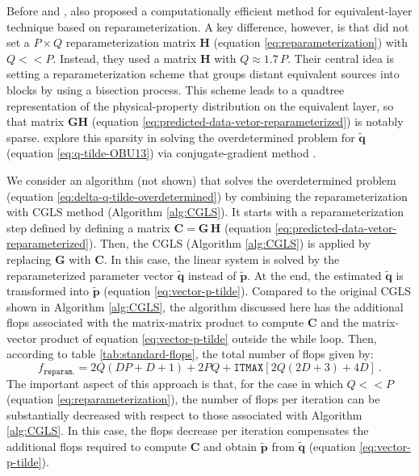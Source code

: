 Before \cite{oliveirajr-etal2013} and \cite{mendonca-2020}, \cite{barnes-lumley2011} also proposed a computationally
efficient method for equivalent-layer technique based on reparameterization. 
A key difference, however, is that \cite{barnes-lumley2011} did not set a $P \times Q$ reparameterization matrix $\mathbf{H}$
(equation \ref{eq:reparameterization}) with $Q << P$. 
Instead, they used a matrix $\mathbf{H}$ with $Q \approx 1.7 \, P$. 
Their central idea is setting a reparameterization scheme that groups distant equivalent sources into blocks by
using a bisection process. 
This scheme leads to a quadtree representation of the physical-property distribution on the equivalent layer, 
so that matrix $\mathbf{G}\mathbf{H}$ (equation \ref{eq:predicted-data-vetor-reparameterized}) is notably sparse.
\cite{barnes-lumley2011} explore this sparsity in solving the overdetermined problem for $\tilde{\mathbf{q}}$
(equation \ref{eq:q-tilde-OBU13}) via conjugate-gradient method \cite[e.g.,][sec. 11.3]{golub-vanloan2013}.

We consider an algorithm (not shown) that solves the overdetermined problem (equation \ref{eq:delta-q-tilde-overdetermined}) by
combining the reparameterization with CGLS method (Algorithm \ref{alg:CGLS}).
It starts with a reparameterization step defined by defining a matrix $\mathbf{C} = \mathbf{G \, H}$ 
(equation \ref{eq:predicted-data-vetor-reparameterized}).
Then, the CGLS (Algorithm \ref{alg:CGLS}) is applied by replacing $\mathbf{G}$ with $\mathbf{C}$.
In this case, the linear system is solved by the reparameterized parameter vector $\tilde{\mathbf{q}}$ instead of
$\tilde{\mathbf{p}}$. At the end, the estimated $\tilde{\mathbf{q}}$ is transformed into $\tilde{\mathbf{p}}$ 
(equation \ref{eq:vector-p-tilde}).
Compared to the original CGLS shown in Algorithm \ref{alg:CGLS}, the algorithm discussed here has the additional flops
associated with the matrix-matrix product to compute $\mathbf{C}$ and the matrix-vector product of equation \ref{eq:vector-p-tilde} outside the while loop.
Then, according to table \ref{tab:standard-flops}, the total number of flops given by:
\begin{equation}
	f_{\mathtt{reparam.}} = 2Q(DP+D+1) + 2PQ + \mathtt{ITMAX} \left[ 2Q \left( 2D + 3 \right) + 4D \right] \: .
	\label{flops:reparameterization-cgls}
\end{equation}
The important aspect of this approach is that, for the case in which $Q << P$ (equation \ref{eq:reparameterization}),
the number of flops per iteration can be substantially decreased with respect to those associated with Algorithm \ref{alg:CGLS}.
In this case, the flops decrease per iteration compensates the additional flops required to compute $\mathbf{C}$ and 
obtain $\tilde{\mathbf{p}}$ from $\tilde{\mathbf{q}}$ (equation \ref{eq:vector-p-tilde}).

